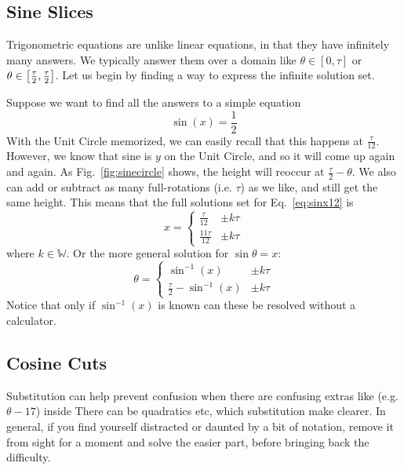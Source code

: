 
\subsection{Sine Slices}
Trigonometric equations are unlike linear equations, in that they have infinitely many
answers.  We typically answer them over a domain like $\theta \in \left[0,\tau\right]$ or
$\theta \in \left[\-\frac{\tau}{2},\frac{\tau}{2}\right]$.  Let us begin by finding a way to
express the infinite solution set.

Suppose we want to find all the answers to a simple equation
\begin{equation}\label{eq:sinx12}
\sin(x) = \frac{1}{2}
\end{equation}
With the Unit Circle memorized, we can easily recall that this happens at 
$\frac{\tau}{12}$.  However, we know that sine is $y$ on the Unit Circle, and so it
will come up again and again.  As Fig.~\ref{fig:sinecircle} shows, the height will
reoccur at $\frac{\tau}{2}-\theta$.  We also can add or subtract as many full-rotations
(i.e. $\tau$) as we like, and still get the same height.  This means that the full
solutions set for Eq.~\ref{eq:sinx12} is
$$
x  = \begin{cases} \frac{\tau}{12} & \pm k\tau\\
\frac{11\tau}{12} & \pm k\tau \end{cases} 
$$
where $k \in \mathbb{W}$.  Or the more general solution for $\sin\theta=x$:
\begin{equation}
\theta  = \begin{cases} \sin^{-1}(x) & \pm k\tau\\
\frac{\tau}{2} - \sin^{-1}(x) & \pm k\tau \end{cases} 
\end{equation}
Notice that only if $\sin^{-1}(x)$ is known can these be resolved without a
calculator.

\subsection{Cosine Cuts}
Substitution can help prevent confusion when there are confusing extras like (e.g. $\theta-17$) inside
There can be quadratics etc, which substitution make clearer.  In general, if you find
yourself distracted or daunted by a bit of notation, remove it from sight for a moment and
solve the easier part, before bringing back the difficulty.

